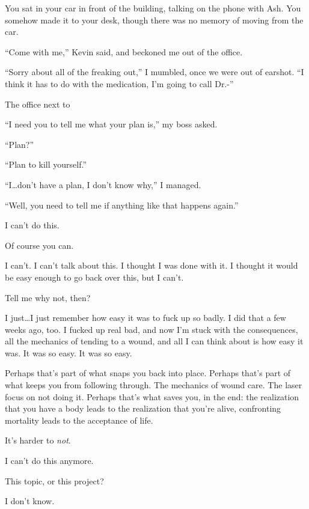 \begin{ally}
You sat in your car in front of the building, talking on the phone with Ash. You somehow made it to your desk, though there was no memory of moving from the car.
\end{ally}
``Come with me,'' Kevin said, and beckoned me out of the office.

``Sorry about all of the freaking out,'' I mumbled, once we were out of earshot. ``I think it has to do with the medication, I'm going to call Dr.-''

\begin{ally}
The office next to
\end{ally}
``I need you to tell me what your plan is,'' my boss asked.

``Plan?''

``Plan to kill yourself.''

``I\ldots{}don't have a plan, I don't know why,'' I managed.

``Well, you need to tell me if anything like that happens again.''
\newpage

\noindent I can't do this.

\begin{ally}
Of course you can.
\end{ally}
I can't. I can't talk about this. I thought I was done with it. I thought it would be easy enough to go back over this, but I can't.

\begin{ally}
Tell me why not, then?
\end{ally}
I just\ldots{}I just remember how easy it was to fuck up so badly. I did that a few weeks ago, too. I fucked up real bad, and now I'm stuck with the consequences, all the mechanics of tending to a wound, and all I can think about is how easy it was. It was so easy. It was so easy.

\begin{ally}
Perhaps that's part of what snaps you back into place. Perhaps that's part of what keeps you from following through. The mechanics of wound care. The laser focus on not doing it. Perhaps that's what saves you, in the end: the realization that you have a body leads to the realization that you're alive, confronting mortality leads to the acceptance of life.
\end{ally}
It's harder to \emph{not}.
\newpage

\noindent I can't do this anymore.

\begin{ally}
This topic, or this project?
\end{ally}
I don't know.
\newpage


